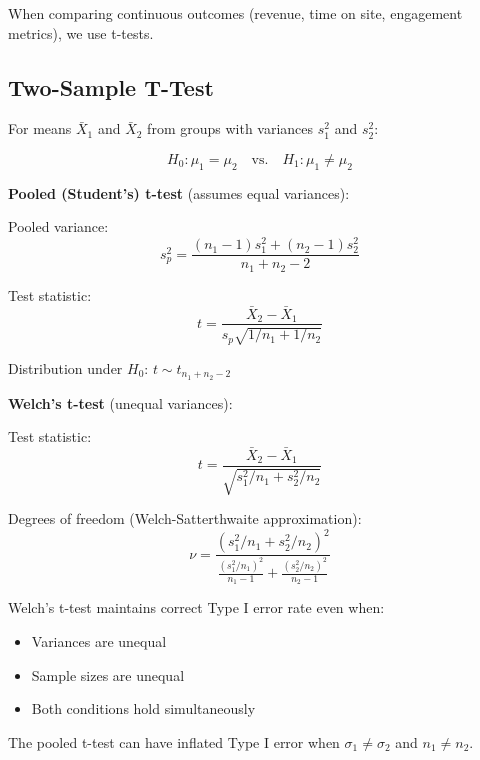 When comparing continuous outcomes (revenue, time on site, engagement metrics), we use t-tests.

\subsection{Two-Sample T-Test}

For means $\bar{X}_1$ and $\bar{X}_2$ from groups with variances $s_1^2$ and $s_2^2$:

\begin{equation}
H_0: \mu_1 = \mu_2 \quad \text{vs.} \quad H_1: \mu_1 \neq \mu_2
\end{equation}

\textbf{Pooled (Student's) t-test} (assumes equal variances):

Pooled variance:
\begin{equation}
s_p^2 = \frac{(n_1 - 1)s_1^2 + (n_2 - 1)s_2^2}{n_1 + n_2 - 2}
\end{equation}

Test statistic:
\begin{equation}
t = \frac{\bar{X}_2 - \bar{X}_1}{s_p \sqrt{1/n_1 + 1/n_2}}
\end{equation}

Distribution under $H_0$: $t \sim t_{n_1 + n_2 - 2}$

\textbf{Welch's t-test} (unequal variances):

Test statistic:
\begin{equation}
t = \frac{\bar{X}_2 - \bar{X}_1}{\sqrt{s_1^2/n_1 + s_2^2/n_2}}
\end{equation}

Degrees of freedom (Welch-Satterthwaite approximation):
\begin{equation}
\nu = \frac{(s_1^2/n_1 + s_2^2/n_2)^2}{\frac{(s_1^2/n_1)^2}{n_1-1} + \frac{(s_2^2/n_2)^2}{n_2-1}}
\end{equation}

\begin{theorem}
Welch's t-test maintains correct Type I error rate even when:
\begin{itemize}
    \item Variances are unequal
    \item Sample sizes are unequal
    \item Both conditions hold simultaneously
\end{itemize}

The pooled t-test can have inflated Type I error when $\sigma_1 \neq \sigma_2$ and $n_1 \neq n_2$.
\end{theorem}

